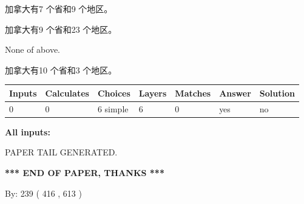 \documentclass{ctexart}
\begin{document}
 
加拿大有7 个省和9 个地区。
 
 
加拿大有9 个省和23 个地区。
 
 
 None of above.
 
 
\noindent{}
 
 
加拿大有10 个省和3 个地区。
 
 
\noindent{}
 
 
   
   
   
   
\noindent\begin{tabular}{|l|l|l|l|l|l|l|}
 \hline
Inputs & Calculates & Choices & Layers & Matches & Answer & Solution \\ \hline
 0  & 
 0  & 
 6
  simple  
  & 
 6  & 
 0  & 
  yes & 
  no 
  \\ \hline
 \end{tabular}
   
   
   
   
\noindent{}
   
   
   
   
\noindent\vspace{0.1in}\hspace{-0.08in} {\textbf{\Large{All inputs: }}}
   
   
   
   
   
   
 \vspace{0.2in}
 
   
   
\vspace{2.0in} PAPER TAIL GENERATED.
   
   
   
   
\vspace{1.0in} 
{\textbf{\large{ *** END OF PAPER, THANKS *** }}} 
   
   
\hspace{1.0in} By: 
 239 ( 416 ,  613 )
   
   
   
   
\newpage 
\setcounter{page}{ 
   456001 } 
   
   
   
\end{document}
